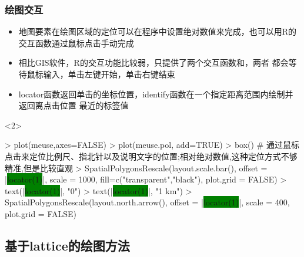 \subsubsection{绘图交互}
\begin{frame}[t,fragile]{\subsecname}{\subsubsecname}
\begin{itemize} 
\item<1-> 地图要素在绘图区域的定位可以在程序中设置绝对数值来完成，也可以用R的交互函数通过鼠标点击手动完成
\item<2-> 相比GIS软件，R的交互功能比较弱，只提供了两个交互函数和，两者
都会等待鼠标输入，单击左键开始，单击右键结束
\item<2-> locator函数返回单击的坐标位置，identify函数在一个指定距离范围内绘制并返回离点击位置
最近的标签值
\end{itemize}

\begin{overlayarea}{\textwidth}{\textheight}
\begin{onlyenv}<2>
\begin{rcode}
> plot(meuse,axes=FALSE)
> plot(meuse.pol, add=TRUE)
> box()
# 通过鼠标点击来定位比例尺、指北针以及说明文字的位置;相对绝对数值,这种定位方式不够精准,但是比较直观
> SpatialPolygonsRescale(layout.scale.bar(), offset = |\colorbox{green}{locator(1)}|, scale = 1000, fill=c("transparent","black"), plot.grid = FALSE)
> text(|\colorbox{green}{locator(1)}|, "0")
> text(|\colorbox{green}{locator(1)}|, "1 km")
> SpatialPolygonsRescale(layout.north.arrow(), offset = |\colorbox{green}{locator(1)}|, scale = 400, plot.grid = FALSE)
\end{rcode}
\end{onlyenv}
\end{overlayarea}
\end{frame}

\subsection{基于lattice的绘图方法}
